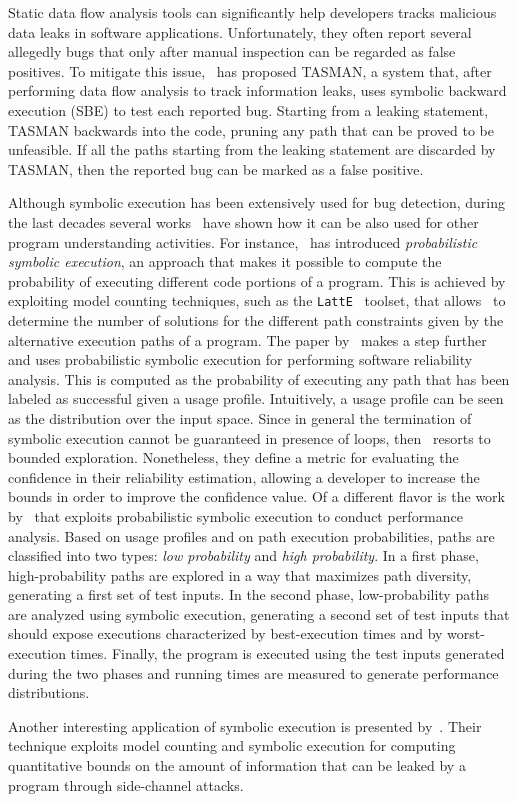 {	Static data flow analysis tools can significantly help developers tracks malicious data leaks in software applications. Unfortunately, they often report several allegedly bugs that only after manual inspection can be regarded as false positives. To mitigate this issue,~\cite{ARH-SOAP15} has proposed TASMAN, a system that, after performing data flow analysis to track information leaks, uses symbolic backward execution (SBE) to test each reported bug. Starting from a leaking statement, TASMAN backwards into the code, pruning any path that can be proved to be unfeasible. If all the paths starting from the leaking statement are discarded by TASMAN, then the reported bug can be marked as a false positive.

	Although symbolic execution has been extensively used for bug detection, during the last decades several works~\cite{GDV-ISSTA12,FPV-ICSE13,CLL-ICSE16} have shown how it can be also used for other program understanding activities. For instance,~\cite{GDV-ISSTA12} has introduced {\em probabilistic symbolic execution}, an approach that makes it possible to compute the probability of executing different code portions of a program. This is achieved by exploiting model counting techniques, such as the {\tt LattE}~\cite{LHT-JSC04} toolset, that allows~\cite{GDV-ISSTA12}  to determine the number of solutions for the different path constraints given by the alternative execution paths of a program. The paper by~\cite{FPV-ICSE13} makes a step further and uses probabilistic symbolic execution for performing software reliability analysis. This is computed as the probability of executing any path that has been labeled as successful given a usage profile. Intuitively, a usage profile can be seen as the distribution over the input space. Since in general the termination of symbolic execution cannot be guaranteed in presence of loops, then~\cite{FPV-ICSE13} resorts to bounded exploration. Nonetheless, they define a metric for evaluating the confidence in their reliability estimation, allowing a developer to increase the bounds in order to improve the confidence value. Of a different flavor is the work by~\cite{CLL-ICSE16} that exploits probabilistic symbolic execution to conduct performance analysis. Based on usage profiles and on path execution probabilities, paths are classified into two types: {\em low probability} and {\em high probability}. In a first phase, high-probability paths are explored in a way that maximizes path diversity, generating a first set of test inputs. In the second phase, low-probability paths are analyzed using symbolic execution, generating a second set of test inputs that should expose executions characterized by best-execution times and by worst-execution times. Finally, the program is executed using the test inputs generated during the two phases and running times are measured to generate performance distributions. 

	Another interesting application of symbolic execution is presented by~\cite{PPM-CSF18}. Their technique exploits model counting and symbolic execution for computing quantitative bounds on the amount of information that can be leaked by a program through side-channel attacks. 
	
}
